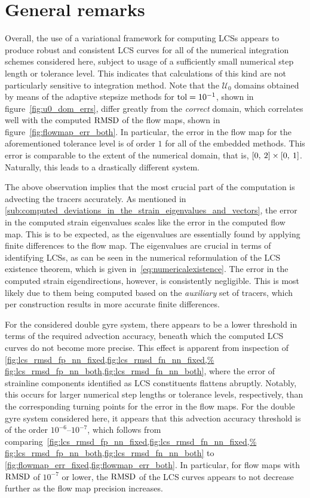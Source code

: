 \section{General remarks}
\label{sec:general_remarks}

Overall, the use of a variational framework for computing LCSs appears to
produce robust and consistent LCS curves for all of the numerical integration
schemes considered here, subject to usage of a sufficiently small numerical
step length or tolerance level. This indicates that calculations of this kind
are not particularly sensitive to integration method. Note that the
$\mathcal{U}_{0}$ domains obtained by means of the adaptive stepsize methods
for $\textnormal{tol}=10^{-1}$, shown in figure~\ref{fig:u0_dom_errs}, differ
greatly from the \emph{correct} domain, which correlates well with the computed
$\operatorname{RMSD}$ of the flow maps, shown in figure~\ref{fig:flowmap_err_both}. In
particular, the error in the flow map for the aforementioned tolerance level is
of order $1$ for all of the embedded methods. This error is comparable to the
extent of the numerical domain, that is,
$[0,\hspace{0.5ex}2]\times[0,\hspace{0.5ex}1]$. Naturally, this leads to a
drastically different system.

The above observation implies that the most crucial part of the computation is
advecting the tracers accurately. As mentioned in
\cref{sub:computed_deviations_in_the_strain_eigenvalues_and_vectors}, the error
in the computed strain eigenvalues scales like the error in the computed flow
map. This is to be expected, as the eigenvalues are essentially found by
applying finite differences to the flow map. The eigenvalues are crucial in
terms of identifying LCSs, as can be seen in the numerical reformulation of the
LCS existence theorem, which is given in~\cref{eq:numericalexistence}.
The error in the computed strain eigendirections, however, is consistently
negligible. This is most likely due to them being computed based on the %
\emph{auxiliary} set of tracers, which per construction results in more accurate
finite differences.

For the considered double gyre system, there appears to be a lower threshold
in terms of the required advection accuracy, beneath which the computed LCS
curves do not become more precise. This effect is apparent
from inspection of
\cref{fig:lcs_rmsd_fp_nn_fixed,fig:lcs_rmsd_fn_nn_fixed,%
fig:lcs_rmsd_fp_nn_both,fig:lcs_rmsd_fn_nn_both}, where the error of strainline
components identified as LCS constituents flattens abruptly. Notably, this
occurs for larger numerical step lengths or tolerance levels, respectively,
than the corresponding turning points for the error in the flow maps.
For the double gyre system considered here, it appears that this advection
accuracy threshold is of the order $10^{-6}$--$10^{-7}$, which follows from
comparing~\cref{fig:lcs_rmsd_fp_nn_fixed,fig:lcs_rmsd_fn_nn_fixed,%
fig:lcs_rmsd_fp_nn_both,fig:lcs_rmsd_fn_nn_both} to
\cref{fig:flowmap_err_fixed,fig:flowmap_err_both}. In particular, for flow maps
with $\operatorname{RMSD}$ of $10^{-7}$ or lower, the $\operatorname{RMSD}$ of the LCS curves appears to
not decrease further as the flow map precision increases.

